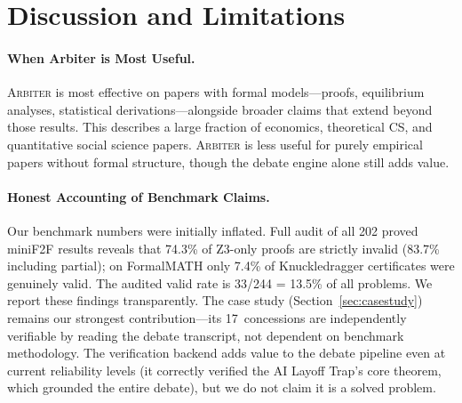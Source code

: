 \documentclass[11pt]{article}
\newcommand{\arbiter}{\textsc{Arbiter}}
\begin{document}
\section{Discussion and Limitations}
\label{sec:discussion}

\paragraph{When Arbiter is Most Useful.}
\arbiter{} is most effective on papers with formal models---proofs, equilibrium analyses, statistical derivations---alongside broader claims that extend beyond those results.
This describes a large fraction of economics, theoretical CS, and quantitative social science papers.
\arbiter{} is less useful for purely empirical papers without formal structure, though the debate engine alone still adds value.

\paragraph{Honest Accounting of Benchmark Claims.}
Our benchmark numbers were initially inflated.
Full audit of all 202 proved miniF2F results reveals that 74.3\% of Z3-only proofs are strictly invalid (83.7\% including partial); on FormalMATH only 7.4\% of Knuckledragger certificates were genuinely valid. The audited valid rate is 33/244 = 13.5\% of all problems.
We report these findings transparently.
The case study (Section~\ref{sec:casestudy}) remains our strongest contribution---its 17~concessions are independently verifiable by reading the debate transcript, not dependent on benchmark methodology.
The verification backend adds value to the debate pipeline even at current reliability levels (it correctly verified the AI Layoff Trap's core theorem, which grounded the entire debate), but we do not claim it is a solved problem.
\end{document}
